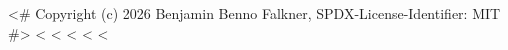 <# Copyright (c) 2026 Benjamin Benno Falkner, SPDX-License-Identifier: MIT #>
<%
<%
\newpage
<%
\exercise<%
<%
